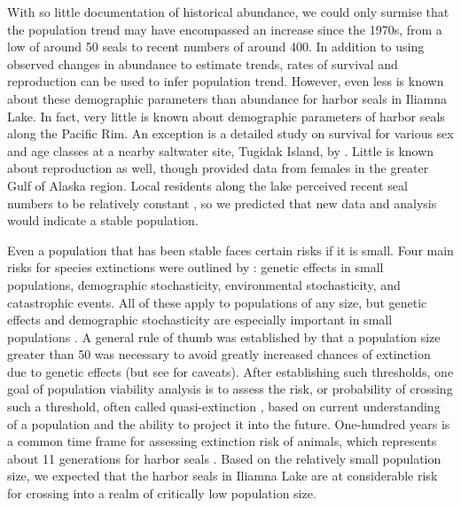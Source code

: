 \documentclass[]{risa}\usepackage[]{graphicx}\usepackage[]{color}
\begin{document}
With so little documentation of historical abundance, we could only surmise that the population trend may have encompassed an increase since the 1970s, from a low of around 50 seals to recent numbers of around 400. In addition to using observed changes in abundance to estimate trends, rates of survival and reproduction can be used to infer population trend.  However, even less is known about these demographic parameters than abundance for harbor seals in Iliamna Lake.  In fact, very little is known about demographic parameters of harbor seals along the Pacific Rim.  An exception is a detailed study on survival for various sex and age classes at a nearby saltwater site, Tugidak Island, by \citet{Hast:Smal:Pend:sex:2012}.  Little is known about reproduction as well, though \citet{Pitc:Calk:biol:1979} provided data from females in the greater Gulf of Alaska region. Local residents along the lake perceived recent seal numbers to be relatively constant \cite{Burn:Van:With:Hole:Asko:inte:2016}, so we predicted that new data and analysis would indicate a stable population.

Even a population that has been stable faces certain risks if it is small.  Four main risks for species extinctions were outlined by \citet{Shaf:mini:1981}: genetic effects in small populations, demographic stochasticity, environmental stochasticity, and catastrophic events.  All of these apply to populations of any size, but genetic effects and demographic stochasticity are especially important in small populations \citep{Good:demo:1987}. A general rule of thumb was established by \citet{Fran:evol:1980} that a population size greater than 50 was necessary to avoid greatly increased chances of extinction due to genetic effects (but see \citet{Tayl:Roja:1999} for caveats).  After establishing such thresholds, one goal of population viability analysis is to assess the risk, or probability of crossing such a threshold, often called quasi-extinction \citep{Ginz:Slob:John:Bind:quas:1982}, based on current understanding of a population and the ability to project it into the future.  One-hundred years is a common time frame for assessing extinction risk of animals, which represents about 11 generations for harbor seals \citep{Swar:Reij:Pete:Van:abse:1996}. Based on the relatively small population size, we expected that the harbor seals in Iliamna Lake are at considerable risk for crossing into a realm of critically low population size.  
\end{document}
